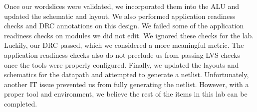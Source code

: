 \documentclass{article}
\begin{document}
	Once our wordslices were validated, we incorporated them into the ALU and updated the schematic and layout. We also performed application readiness checks and DRC annotations on this design. We failed some of the application readiness checks on modules we did not edit. We ignored these checks for the lab. Luckily, our DRC passed, which we considered a more meaningful metric. The application readiness checks also do not preclude us from passing LVS checks once the tools were properly configured. Finally, we updated the layouts and schematics for the datapath and attempted to generate a netlist. Unfortunately, another IT issue prevented us from fully generating the netlist. However, with a proper tool and environment, we believe the rest of the items in this lab can be completed.
	
\end{document}
